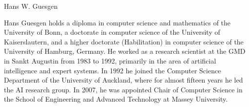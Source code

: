 \documentclass[10pt,journal,cspaper,compsoc]{IEEEtran}
\begin{document}
\begin{biography}{Hans W. Guesgen}

Hans Guesgen holds a diploma in computer science and mathematics of the University of Bonn, a doctorate in computer science of the University of Kaiserslautern, and a higher doctorate (Habilitation) in computer science of the University of Hamburg, Germany. He worked as a research scientist at the GMD in Sankt Augustin from 1983 to 1992, primarily in the area of artificial intelligence and expert systems. 
In 1992 he joined the Computer Science Department of the University of Auckland, where for almost fifteen years he led the AI research group. %
In 2007, he was appointed Chair of Computer Science in the School of Engineering and Advanced Technology at Massey University.
\end{biography}









\end{document}
